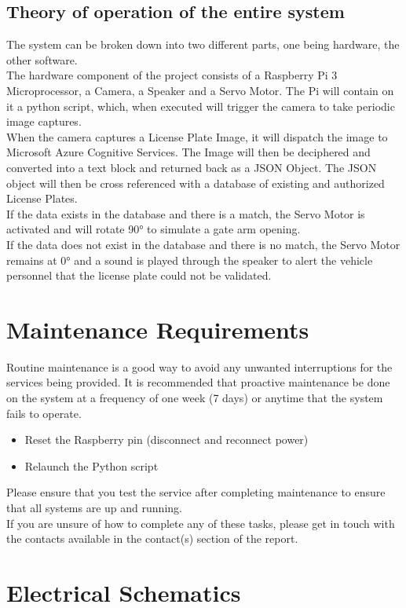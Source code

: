 \documentclass[a4paper,12pt]{article}
\begin{document}
\subsection{Theory of operation of the entire system}
The system can be broken down into two different parts, one being hardware, the other software. \\
The hardware component of the project consists of a Raspberry Pi 3 Microprocessor, a Camera, a Speaker and a Servo Motor. The Pi will contain on it a python script, which, when executed will trigger the camera to take periodic image captures. \\
When the camera captures a License Plate Image, it will dispatch the image to Microsoft Azure Cognitive Services. The Image will then be deciphered and converted into a text block and returned back as a JSON Object. The JSON object will then be cross referenced with a database of existing and authorized License Plates.\\
If the data exists in the database and there is a match, the Servo Motor is activated and will rotate \ang{90} to simulate a gate arm opening.\\
If the data does not exist in the database and there is no match, the Servo Motor remains at \ang{0} and a sound is played through the speaker to alert the vehicle personnel that the license plate could not be validated. 
\newpage
\section{Maintenance Requirements}
Routine maintenance is a good way to avoid any unwanted interruptions for the services being provided. It is recommended that proactive maintenance be done on the system at a frequency of one week (7 days) or anytime that the system fails to operate.
\begin{itemize}
    \item Reset the Raspberry pin (disconnect and reconnect power)
    \item Relaunch the Python script
\end{itemize}
Please ensure that you test the service after completing maintenance to ensure that all systems are up and running. \\
If you are unsure of how to complete any of these tasks, please get in touch with the contacts available in the contact(s) section of the report.

\appendix
\newpage
\section{Electrical Schematics}
\newpage
\end{document}
